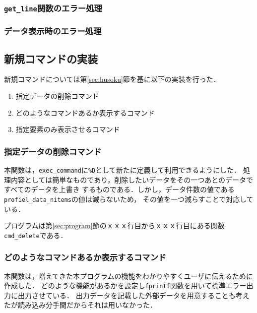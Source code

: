 \documentclass[a4j,11pt]{jarticle}
\begin{document}
\subsubsection{\texttt{get\_line}関数のエラー処理}
\subsubsection{データ表示時のエラー処理}

\subsection{新規コマンドの実装}
新規コマンドについては第\ref{sec:husoku}節を基に以下の実装を行った．
\begin{enumerate}
\setlength{\parskip}{2pt} \setlength{\itemsep}{2pt}
    \item 指定データの削除コマンド
    \item どのようなコマンドあるか表示するコマンド
    \item 指定要素のみ表示させるコマンド
\end{enumerate}
\subsubsection{指定データの削除コマンド}\label{sec:sakujyo}
本関数は，\verb|exec_command|に\verb|%D|として新たに定義して利用できるようにした．
処理内容としては簡単なものであり，削除したいデータをその一つあとのデータですべてのデータを上書き
するものである．しかし，データ件数の値である\verb|profiel_data_nitems|の値は減らないため，
その値を一つ減らすことで対応している．

プログラムは第\ref{sec:program}節のｘｘｘ行目からｘｘｘ行目にある関数\verb|cmd_delete|である．
\subsubsection{どのようなコマンドあるか表示するコマンド}\label{sec:help}
本関数は，増えてきた本プログラムの機能をわかりやすくユーザに伝えるために作成した．
どのような機能があるかを設定し\verb|fprintf|関数を用いて標準エラー出力に出力させている．
出力データを記載した外部データを用意することも考えたが読み込み分手間だからそれは用いなかった．
\end{document}

